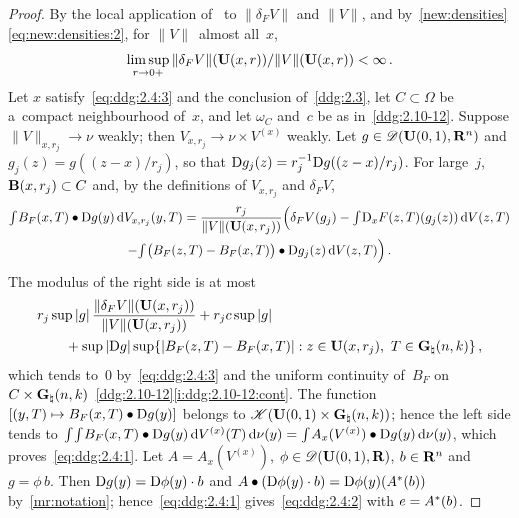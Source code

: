 \documentclass[a4paper,twoside,leqno]{article}
\newcommand{\Gk}{\pgrass{\adim}{\vdim}}        %
\begin{document}
\begin{proof}
    By the local application of~\cite[2.8.18, 2.9.5]{Federer1969} to $\|\delta_F V\|$ and $\|V\|$,
    and by~\ref{new:densities}\eqref{eq:new:densities:2}, for $\|V\|$~almost all~$x$,
    \begin{equation}
        \label{eq:ddg:2.4:3}
        \limsup_{r \to 0+} \|\delta_F V\|(\mathbf{U}(x,r)) / \|V\|(\mathbf{U}(x,r)) < \infty \,.
    \end{equation}
    Let $x$ satisfy~\eqref{eq:ddg:2.4:3} and the conclusion of~\ref{ddg:2.3}, let $C \subset
    \Omega$ be a~compact neighbourhood of~$x$, and let $\omega_C$ and~$c$ be as
    in~\ref{ddg:2.10-12}. Suppose $\|V\|_{x,r_j} \to \nu$ weakly; then $V_{x,r_j} \to \nu \times
    V^{(x)}$ weakly. Let $g \in \mathscr{D}(\mathbf{U}(0,1),\mathbf{R}^{n})$ and $g_j(z) = g((z - x)/r_j)$, so
    that $\mathrm{D} g_j(z) = r_j^{-1} \mathrm{D} g((z-x)/r_j)$. For large~$j$, $\mathbf{B}(x,r_j) \subset C$ and, by
    the definitions of $V_{x,r_j}$ and $\delta_F V$,
    \begin{multline*}
        {\textstyle\int_{}^{}} B_F(x,T) \bullet \mathrm{D} g(y) \,\mathrm{d} V_{x,r_j}(y,T)
        = \frac{r_j}{\|V\|(\mathbf{U}(x,r_j))} \Bigl( \delta_F V(g_j) - {\textstyle\int_{}^{}} \mathrm{D}_x F(z,T)(g_j(z))
        \,\mathrm{d} V(z,T) \\
        - {\textstyle\int_{}^{}} \bigl( B_F(z,T) - B_F(x,T) \bigr) \bullet \mathrm{D} g_j(z) \,\mathrm{d} V(z,T) \Bigr) \,.
    \end{multline*}
    The modulus of the right side is at most
    \begin{displaymath}
        \begin{aligned}
            & r_j \sup|g| \, \frac{\|\delta_F V\|(\oball{x}{r_j})}{\|V\|(\oball{x}{r_j})} + r_j c
            \sup|g| \\
            & \qquad + \sup |\uD g| \sup \{ |B_F(z,T) - B_F(x,T)| : z \in \oball{x}{r_j},\ T \in
            \Gk \} \,,
        \end{aligned}
    \end{displaymath}
    which tends to~$0$ by~\eqref{eq:ddg:2.4:3} and the uniform continuity of~$B_F$ on $C \times
    \Gk$~\ref{ddg:2.10-12}\ref{i:ddg:2.10-12:cont}. The function $[ (y,T) \mapsto B_F(x,T) \bullet
    \mathrm{D} g(y) ]$ belongs to $\ccspace{\oball{0}{1} \times \Gk}$; hence the left side tends to
    ${\textstyle\int_{}^{}} {\textstyle\int_{}^{}} B_F(x,T) \bullet \mathrm{D} g(y) \,\mathrm{d} V^{(x)}(T) \,\mathrm{d} \nu(y) =
    {\textstyle\int_{}^{}} A_x(V^{(x)}) \bullet \mathrm{D} g(y) \,\mathrm{d} \nu(y)$, which proves~\eqref{eq:ddg:2.4:1}. Let
    $A = A_x(V^{(x)})$, $\phi \in \mathscr{D}(\mathbf{U}(0,1),\mathbf{R})$, $b \in \mathbf{R}^{n}$ and $g = \phi \,
    b$. Then $\mathrm{D} g(y) = \mathrm{D} \phi(y) \cdot b$ and $A \bullet (\mathrm{D} \phi(y) \cdot b) = \mathrm{D}
    \phi(y)(A^{*}(b))$ by~\ref{mr:notation}; hence~\eqref{eq:ddg:2.4:1}
    gives~\eqref{eq:ddg:2.4:2} with $e = A^{*}(b)$.
\end{proof}
\end{document}
